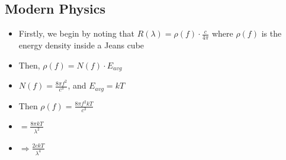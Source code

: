 \documentclass{article}
\begin{document}
\subsection{Modern Physics}


\begin{itemize}
    \item Firstly, we begin by noting that \(R(\lambda)=\rho(f)\cdot\frac{c}{4\pi}\) where \(\rho(f)\) is the energy density inside a Jeans cube
    \item Then, \(\rho(f)=N(f)\cdot E_{avg}\) 
    \item \(N(f)=\frac{8\pi f^2}{c^3}\), and \(E_{avg} = kT\)
    \item Then \(\rho(f)=\frac{8\pi f^2kT}{c^3}\)
    \item \(=\frac{8\pi kT}{\lambda^2}\)
    \item \(\Rightarrow\boxed{\frac{2ckT}{\lambda^4}}\)
\end{itemize}


\end{document}
